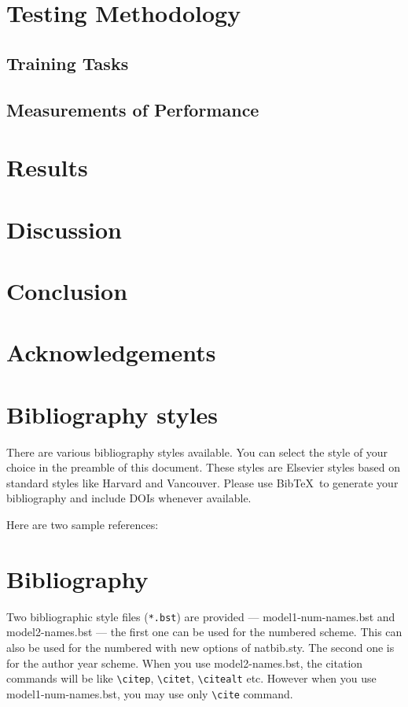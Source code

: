 \documentclass[a4paper,fleqn]{cas-dc}
\begin{document}
\section{Testing Methodology}
\subsection{Training Tasks}
\subsection{Measurements of Performance}
\section{Results}
\section{Discussion}


\section{Conclusion}
\section{Acknowledgements}



\section{Bibliography styles}


There are various bibliography styles available. You can select the
style of your choice in the preamble of this document. These styles are
Elsevier styles based on standard styles like Harvard and Vancouver.
Please use Bib\TeX\ to generate your bibliography and include DOIs
whenever available.

Here are two sample references: 
\citep{Fortunato2010}
\cite{Fortunato2010,NewmanGirvan2004}
\cite{Fortunato2010,Vehlowetal2013}




  





\section{Bibliography}

Two bibliographic style files (\verb+*.bst+) are provided ---
{model1-num-names.bst} and {model2-names.bst} --- the first one can be
used for the numbered scheme. This can also be used for the numbered
with new options of {natbib.sty}. The second one is for the author year
scheme. When  you use model2-names.bst, the citation commands will be
like \verb+\citep+,  \verb+\citet+, \verb+\citealt+ etc. However when
you use model1-num-names.bst, you may use only \verb+\cite+ command.
\end{document}
